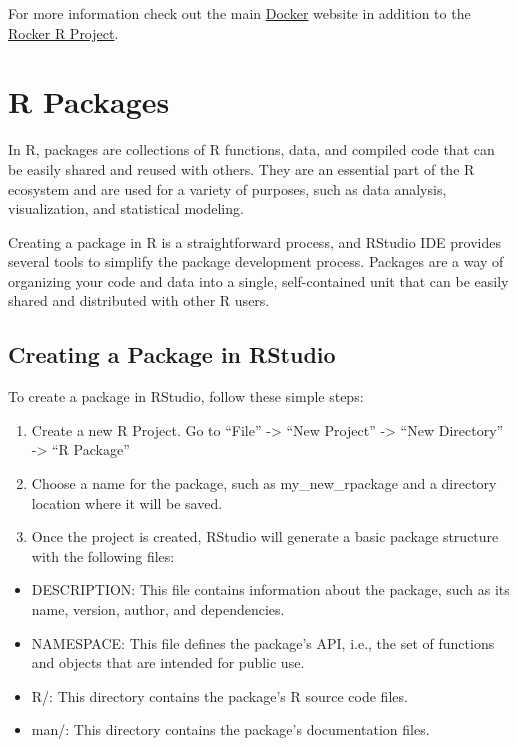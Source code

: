 \documentclass[
]{book}
\providecommand{\tightlist}{%
  \setlength{\itemsep}{0pt}\setlength{\parskip}{0pt}}
\begin{document}
For more information check out the main \href{https://www.docker.com/}{Docker} website in addition to the \href{https://rocker-project.org/}{Rocker R Project}.

\hypertarget{r-packages}{%
\section{R Packages}\label{r-packages}}

In R, packages are collections of R functions, data, and compiled code that can be easily shared and reused with others. They are an essential part of the R ecosystem and are used for a variety of purposes, such as data analysis, visualization, and statistical modeling.

Creating a package in R is a straightforward process, and RStudio IDE provides several tools to simplify the package development process. Packages are a way of organizing your code and data into a single, self-contained unit that can be easily shared and distributed with other R users.

\hypertarget{creating-a-package-in-rstudio}{%
\subsection*{Creating a Package in RStudio}\label{creating-a-package-in-rstudio}}

To create a package in RStudio, follow these simple steps:

\begin{enumerate}
\def\labelenumi{\arabic{enumi}.}
\tightlist
\item
  Create a new R Project. Go to ``File'' -\textgreater{} ``New Project'' -\textgreater{} ``New Directory'' -\textgreater{} ``R Package''
\item
  Choose a name for the package, such as my\_new\_rpackage and a directory location where it will be saved.
\item
  Once the project is created, RStudio will generate a basic package structure with the following files:
\end{enumerate}

\begin{itemize}
\tightlist
\item
  DESCRIPTION: This file contains information about the package, such as its name, version, author, and dependencies.
\item
  NAMESPACE: This file defines the package's API, i.e., the set of functions and objects that are intended for public use.
\item
  R/: This directory contains the package's R source code files.
\item
  man/: This directory contains the package's documentation files.
\end{itemize}
\end{document}
